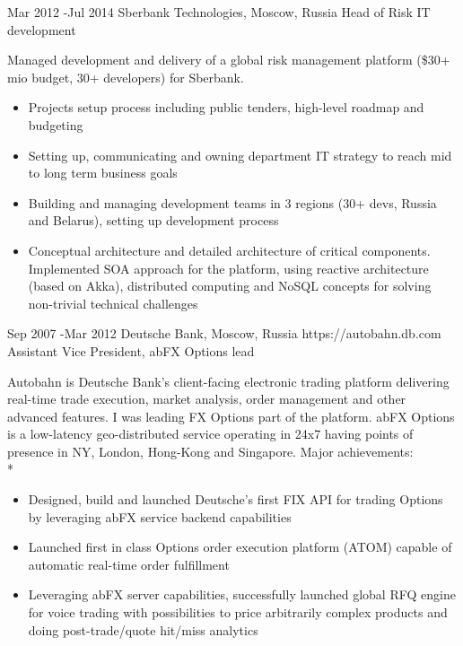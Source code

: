 \documentclass[10pt]{article} %
\begin{document}
        \job
        {Mar 2012 -}{Jul 2014}
        {Sberbank Technologies, Moscow, Russia}
        {}
        {Head of Risk IT development}
        {Managed development and delivery of a global risk management platform (\$30+ mio budget, 30+ developers) for Sberbank.
        \begin{itemize}
            \item{Projects setup process including public tenders, high-level roadmap and budgeting}
            \item{Setting up, communicating and owning department IT strategy to reach mid to long term business goals}
            \item{Building and managing development teams in 3 regions (30+ devs, Russia and Belarus), setting up development process}
            \item{Conceptual architecture and detailed architecture of critical components. Implemented SOA approach for
                the platform, using reactive architecture (based on Akka), distributed computing and NoSQL concepts for solving non-trivial technical
                challenges}
        \end{itemize}
        }

        \job
        {Sep 2007 -}{Mar 2012}
        {Deutsche Bank, Moscow, Russia}
        {https://autobahn.db.com}
        {Assistant Vice President, abFX Options lead}
        {Autobahn is Deutsche Bank's client-facing electronic trading platform delivering real-time trade execution, market analysis, order management and other advanced features. 
        I was leading FX Options part of the platform. abFX Options is a low-latency geo-distributed service operating in 24x7 having points of presence in NY, London, Hong-Kong and Singapore. 
        Major achievements: \\*
        \begin{itemize}
            \item{Designed, build and launched Deutsche's first FIX API for trading Options by leveraging abFX service backend capabilities}
            \item{Launched first in class Options order execution platform (ATOM) capable of automatic real-time order fulfillment}
            \item{Leveraging abFX server capabilities, successfully launched global RFQ engine for voice trading with possibilities to price arbitrarily complex products and doing post-trade/quote hit/miss analytics}
        \end{itemize}
        }
\end{document}

